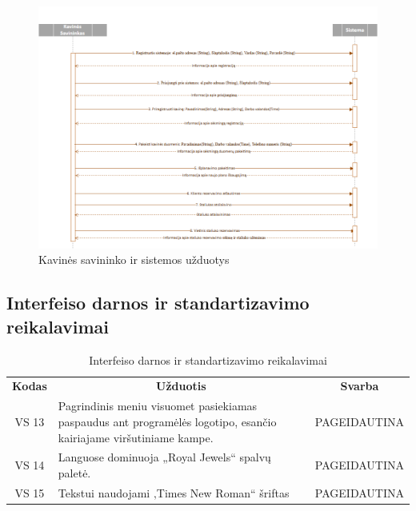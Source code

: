 \documentclass{VUMIFPSkursinis}
\begin{document}
{{{{{\begin{landscape}
	\begin {figure}[H]
		\includegraphics[width=1.3\textwidth,height=1.4\textheight,keepaspectratio]{img/c}
		\caption{Kavinės savininko ir sistemos užduotys}
		\label{fig:c}
	\end{figure}
\end{landscape}


\subsection{Interfeiso darnos ir standartizavimo reikalavimai}
\begin{center}
	\begin{table}[H]
	\caption{Interfeiso darnos ir standartizavimo reikalavimai}
	\begin{tabular}{|p{2cm}|p{14cm}|p{2cm}|}
	\hline
	    \rowcolor{lightgray}
	    \multicolumn{3}{|c|}{Interfeiso darnos ir standartizavimo reikalavimai}\\
	\hline
		\multicolumn{1}{|c|}{{\bfseries Kodas}}&
		\multicolumn{1}{|c|}{ {\bfseries Užduotis}}&
		\multicolumn{1}{|c|}{{\bfseries Svarba}}\\		
	\hline
		\multicolumn{1}{|c|}{VS 13}&
		\multicolumn{1}{|p{12,9cm}|}{Pagrindinis meniu visuomet pasiekiamas paspaudus ant programėlės logotipo, esančio kairiajame viršutiniame kampe.}& 
		\multicolumn{1}{|p{1.5cm}|}{PAGEIDAUTINA}\\
	\hline
		\multicolumn{1}{|c|}{VS 14}&
		\multicolumn{1}{|p{12cm}|}{Languose dominuoja „Royal Jewels“ spalvų paletė.}& 
		\multicolumn{1}{|p{1.5cm}|}{PAGEIDAUTINA}\\
	\hline
		\multicolumn{1}{|c|}{VS 15}&
		\multicolumn{1}{|p{12cm}|}{Tekstui naudojami ‚Times New Roman“ šriftas}& 
		\multicolumn{1}{|p{1.5cm}|}{PAGEIDAUTINA}\\
	\hline  	 	
	

\end{tabular}
\end{table}
\end{center}}}}}}
\end{document}
